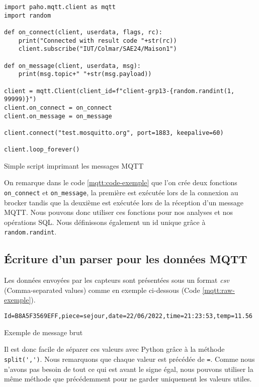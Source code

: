 \documentclass{article}
\begin{document}
    \begin{listing}[H]
        \begin{verbatim}
import paho.mqtt.client as mqtt
import random

def on_connect(client, userdata, flags, rc):
    print("Connected with result code "+str(rc))
    client.subscribe("IUT/Colmar/SAE24/Maison1")

def on_message(client, userdata, msg):
    print(msg.topic+" "+str(msg.payload))

client = mqtt.Client(client_id=f"client-grp13-{random.randint(1, 99999)}")
client.on_connect = on_connect
client.on_message = on_message

client.connect("test.mosquitto.org", port=1883, keepalive=60)

client.loop_forever()
        \end{verbatim}
        \caption{Simple script imprimant les messages MQTT}
        \label{mqtt:code-exemple}
    \end{listing}
    On remarque dans le code \ref{mqtt:code-exemple} que l'on crée deux fonctions \verb|on_connect| et \verb|on_message|, la première est exécutée lors de la connexion au brocker tandis que la deuxième est exécutée lors de la réception d'un message MQTT. 
    Nous pouvons donc utiliser ces fonctions pour nos analyses et nos opérations SQL.
    Nous définissons également un id unique grâce à \verb|random.randint|.

    \subsection{Écriture d'un parser pour les données MQTT}
    Les données envoyées par les capteurs sont présentées sous un format \emph{csv} (Comma-separated values) comme en exemple ci-dessous (Code \ref{mqtt:raw-exemple}). 
    \begin{listing}[H]
        \begin{verbatim}
Id=B8A5F3569EFF,piece=sejour,date=22/06/2022,time=21:23:53,temp=11.56
        \end{verbatim}
        \caption{Exemple de message brut}
        \label{mqtt:raw-exemple}
    \end{listing}
    Il est donc facile de séparer ces valeurs avec Python grâce à la méthode \verb|split(',')|. Nous remarquons que chaque valeur est précédée de \verb|=|. 
    Comme nous n'avons pas besoin de tout ce qui est avant le signe égal, nous pouvons utiliser la même méthode que précédemment pour ne garder uniquement les valeurs utiles.
\end{document}
